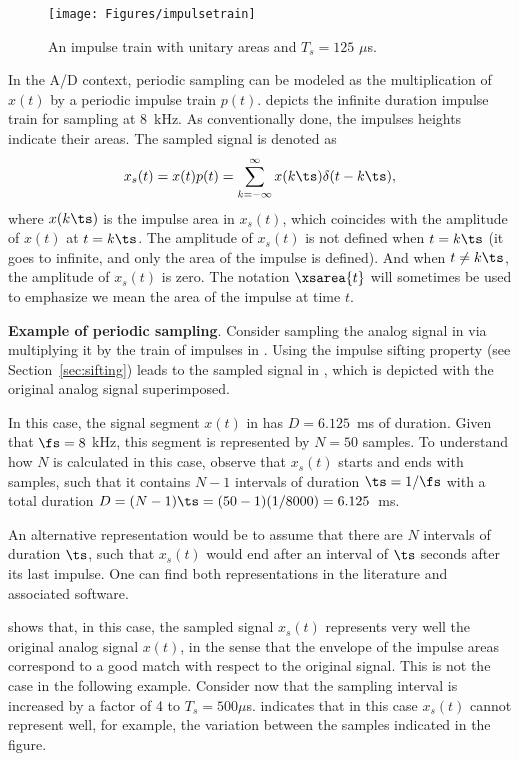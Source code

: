 \begin{figure}
	\centering
		\texttt{[image: Figures/impulsetrain]}		
	\caption{An impulse train with unitary areas and $T_s = 125$ $\mu$s.\label{fig:impulsetrain}}
\end{figure}

In the A/D context, periodic sampling can be modeled as the multiplication of $x(t)$ by a periodic impulse train $p(t)$.
 depicts the infinite duration impulse train for sampling at 8~kHz. As conventionally done, the impulses heights indicate their areas.
The sampled signal is denoted as
\[
x_s(t) = x(t) p(t) = \sum_{k=-\infty}^\infty x(k \ts) \delta(t-k \ts),
\]
where $x(k \ts)$ is the impulse area in $x_s(t)$, which coincides with the amplitude of $x(t)$ at $t=k \ts$.
The amplitude of $x_s(t)$ is not defined when $t = k \ts$ (it goes to infinite, and only the area of the impulse is defined). 
And when $t \ne k \ts$, the amplitude of $x_s(t)$ is zero.
The notation $\xsarea{t}$ will sometimes be used to emphasize we mean the area of the impulse at time $t$.


\bExample \textbf{Example of periodic sampling}.
Consider sampling the analog signal in  via multiplying it by the train of impulses in . Using the impulse sifting property (see Section~\ref{sec:sifting}) leads to the sampled signal in , which is depicted with the original analog signal superimposed.

In this case, the signal segment $x(t)$ in  has $D=6.125$~ms of duration. Given that $\fs = 8$ kHz, this segment is represented by $N=50$ samples. To understand how $N$ is calculated in this case, observe that $x_s(t)$ starts and ends with samples, such that it contains $N-1$ intervals of duration $\ts = 1/\fs$ with a total duration $D = (N-1) \ts = (50-1) (1/8000)= 6.125$~ms.

An alternative representation would be to assume that there are $N$ intervals of duration $\ts$, such that $x_s(t)$ would end after an interval of $\ts$ seconds after its last impulse. One can find both representations in the literature and associated software.
\eExample

 shows that, in this case, the sampled signal $x_s(t)$ represents very well the original analog signal $x(t)$, in the sense that the envelope of the impulse areas correspond to a good match with respect to the original signal. This is not the case in the following example. Consider now that the sampling interval is increased by a factor of 4 to $T_s = 500 \mu$s.  indicates that in this case $x_s(t)$ cannot represent well, for example, the variation between the samples indicated in the figure.

